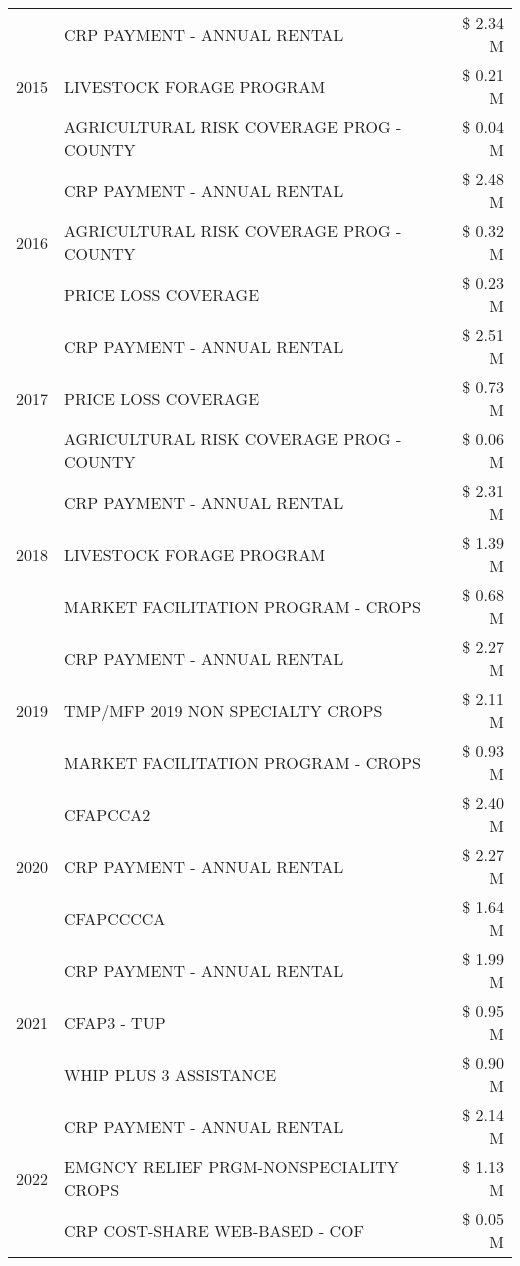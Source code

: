 \begin{tabular}{llr}
\multirow[t]{3}{*}{2015} & CRP PAYMENT - ANNUAL RENTAL & \$ 2.34 M \\
 & LIVESTOCK FORAGE PROGRAM & \$ 0.21 M \\
 & AGRICULTURAL RISK COVERAGE PROG - COUNTY & \$ 0.04 M \\
\cline{1-3}
\multirow[t]{3}{*}{2016} & CRP PAYMENT - ANNUAL RENTAL & \$ 2.48 M \\
 & AGRICULTURAL RISK COVERAGE PROG - COUNTY & \$ 0.32 M \\
 & PRICE LOSS COVERAGE & \$ 0.23 M \\
\cline{1-3}
\multirow[t]{3}{*}{2017} & CRP PAYMENT - ANNUAL RENTAL & \$ 2.51 M \\
 & PRICE LOSS COVERAGE & \$ 0.73 M \\
 & AGRICULTURAL RISK COVERAGE PROG - COUNTY & \$ 0.06 M \\
\cline{1-3}
\multirow[t]{3}{*}{2018} & CRP PAYMENT - ANNUAL RENTAL & \$ 2.31 M \\
 & LIVESTOCK FORAGE PROGRAM & \$ 1.39 M \\
 & MARKET FACILITATION PROGRAM - CROPS & \$ 0.68 M \\
\cline{1-3}
\multirow[t]{3}{*}{2019} & CRP PAYMENT - ANNUAL RENTAL & \$ 2.27 M \\
 & TMP/MFP 2019 NON SPECIALTY CROPS & \$ 2.11 M \\
 & MARKET FACILITATION PROGRAM - CROPS & \$ 0.93 M \\
\cline{1-3}
\multirow[t]{3}{*}{2020} & CFAPCCA2 & \$ 2.40 M \\
 & CRP PAYMENT - ANNUAL RENTAL & \$ 2.27 M \\
 & CFAPCCCCA & \$ 1.64 M \\
\cline{1-3}
\multirow[t]{3}{*}{2021} & CRP PAYMENT - ANNUAL RENTAL & \$ 1.99 M \\
 & CFAP3 - TUP & \$ 0.95 M \\
 & WHIP PLUS 3 ASSISTANCE & \$ 0.90 M \\
\cline{1-3}
\multirow[t]{3}{*}{2022} & CRP PAYMENT - ANNUAL RENTAL & \$ 2.14 M \\
 & EMGNCY RELIEF PRGM-NONSPECIALITY CROPS & \$ 1.13 M \\
 & CRP COST-SHARE WEB-BASED - COF & \$ 0.05 M \\
\cline{1-3}
\bottomrule
\end{tabular}
